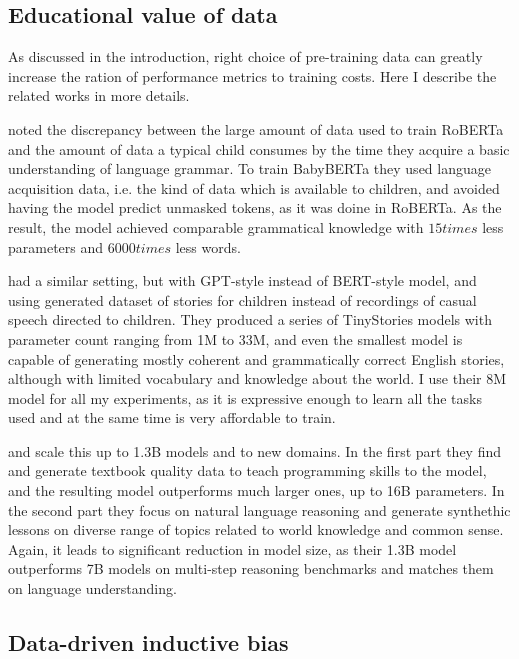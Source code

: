 \documentclass[a4paper, 11pt, oneside]{article}
\begin{document}
	\subsection{Educational value of data}

	As discussed in the introduction, right choice of pre-training data can
	greatly increase the ration of performance metrics to training costs. Here I describe
	the related works in more details.

	\citet{huebner2021babyberta} noted the discrepancy between the large amount of
	data used to train RoBERTa \cite{liu2019roberta} and the amount of data a
	typical child consumes by the time they acquire a basic understanding of
	language grammar. To train BabyBERTa they used language acquisition data, i.e.
	the kind of data which is available to children, and avoided having the model
	predict unmasked tokens, as it was doine in RoBERTa. As the result, the model achieved
	comparable grammatical knowledge with $15times$ less parameters and $6000times$
	less words.

	\citet{eldan2023tinystories} had a similar setting, but with GPT-style instead
	of BERT-style model, and using generated dataset of stories for children
	instead of recordings of casual speech directed to children. They produced a series
	of TinyStories models with parameter count ranging from 1M to 33M, and even
	the smallest model is capable of generating mostly coherent and grammatically
	correct English stories, although with limited vocabulary and knowledge about the
	world. I use their 8M model for all my experiments, as it is expressive enough
	to learn all the tasks used and at the same time is very affordable to train.

	\citet{gunasekar2023textbooks} and \citet{li2023textbooks} scale this up to 1.3B
	models and to new domains. In the first part they find and generate textbook quality
	data to teach programming skills to the model, and the resulting model
	outperforms much larger ones, up to 16B parameters. In the second part they
	focus on natural language reasoning and generate synthethic lessons on diverse
	range of topics related to world knowledge and common sense. Again, it leads
	to significant reduction in model size, as their 1.3B model outperforms 7B
	models on multi-step reasoning benchmarks and matches them on language
	understanding.

	\subsection{Data-driven inductive bias}
\end{document}

